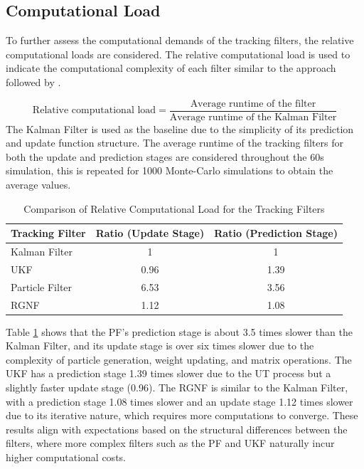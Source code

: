 \subsection{Computational Load}
To further assess the computational demands of the tracking filters, the relative computational loads are considered. The relative computational load is used to indicate the computational complexity of each filter similar to the approach followed by \cite{Li2021}.

\[
\text{Relative computational load} = \frac{\text{Average runtime of the filter}}{\text{Average runtime of the Kalman Filter}}
\]
\newline
The Kalman Filter is used as the baseline due to the simplicity of its prediction and update function structure. The average runtime of the tracking filters for both the update and prediction stages are considered throughout the 60s simulation, this is repeated for 1000 Monte-Carlo simulations to obtain the average values.
\newline
\begin{table}[H]
    \centering
    \caption{Comparison of Relative Computational Load for the Tracking Filters}
    \begin{tabular}{l c c}
        \toprule
        \textbf{Tracking Filter} & \textbf{Ratio (Update Stage)} & \textbf{Ratio (Prediction Stage)} \\
        \midrule
        Kalman Filter & 1 & 1 \\ 
        UKF & 0.96 & 1.39 \\ 
        Particle Filter & 6.53 & 3.56 \\ 
        RGNF & 1.12 & 1.08 \\
        \bottomrule
    \end{tabular}
    \label{tab:filter_comparison}
\end{table}
Table \ref{tab:filter_comparison} shows that the \ac{PF}’s prediction stage is about 3.5 times slower than the Kalman Filter, and its update stage is over six times slower due to the complexity of particle generation, weight updating, and matrix operations. The \ac{UKF} has a prediction stage 1.39 times slower due to the \ac{UT} process but a slightly faster update stage (0.96). The \ac{RGNF} is similar to the Kalman Filter, with a prediction stage 1.08 times slower and an update stage 1.12 times slower due to its iterative nature, which requires more computations to converge. These results align with expectations based on the structural differences between the filters, where more complex filters such as the \ac{PF} and \ac{UKF} naturally incur higher computational costs.

